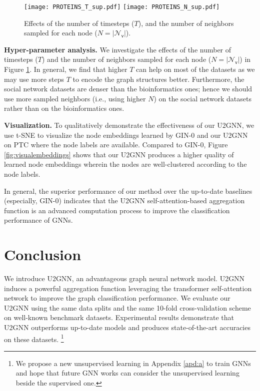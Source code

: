 \documentclass[twoside,leqno,twocolumn]{article}
\newcommand{\citep}{\cite}
\begin{document}
\begin{figure}[!ht]
\centering
    \texttt{[image: PROTEINS\_T\_sup.pdf]}
    \texttt{[image: PROTEINS\_N\_sup.pdf]}
\caption[short]{Effects of the number of timesteps ($T$), and the number of neighbors sampled for each node ($N=|\mathcal{N}_\mathsf{v}|$).}
\label{fig:effectTN_PROTEINS}
\end{figure}

\textbf{Hyper-parameter analysis.} We investigate the effects of the number of timesteps ($T$) and the number of neighbors sampled for each node ($N=|\mathcal{N}_\mathsf{v}|$) in Figure \ref{fig:effectTN_PROTEINS}.
In general, we find that higher $T$ can help on most of the datasets as we may use more steps $T$ to encode the graph structures better.
Furthermore, the social network datasets are denser than the bioinformatics ones; hence we should use more sampled neighbors (i.e., using higher $N$) on the social network datasets rather than on the bioinformatics ones.


\textbf{Visualization.} To qualitatively demonstrate the effectiveness of our U2GNN, we use t-SNE \citep{maaten2008visualizing} to visualize the node embeddings learned by GIN-0 and our U2GNN on \textsc{PTC} where the node labels are available.
Compared to GIN-0, Figure \ref{fig:visualembeddings} shows that our U2GNN produces a higher quality of learned node embeddings wherein the nodes are well-clustered according to the node labels.

In general, the superior performance of our method over the up-to-date baselines (especially, \mbox{GIN-0}) indicates that the U2GNN self-attention-based aggregation function is an advanced computation process to improve the classification performance of GNNs.


\section{Conclusion}
\label{sec:conclusion}

We introduce U2GNN, an advantageous graph neural network model.
U2GNN induces a powerful aggregation function leveraging the transformer self-attention network to improve the graph classification performance. 
We evaluate our U2GNN using the same data splits and the same 10-fold cross-validation scheme on well-known benchmark datasets. 
Experimental results demonstrate that U2GNN outperforms up-to-date models and produces state-of-the-art accuracies on these datasets.
\footnote{We propose a new unsupervised learning in Appendix \ref{apd:a} to train GNNs and hope that future GNN works can consider the unsupervised learning beside the supervised one.}
\end{document}
